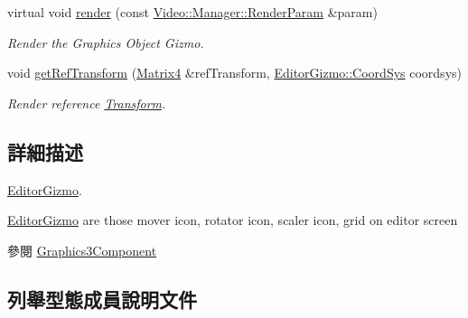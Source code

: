 \begin{DoxyCompactItemize}
virtual void \hyperlink{class_i_dream_sky_1_1_editor_gizmo_a85dc05a2eb5c2b8e1f8e623d9f82a891}{render} (const \hyperlink{class_i_dream_sky_1_1_video_1_1_manager_1_1_render_param}{Video\+::\+Manager\+::\+Render\+Param} \&param)
\begin{DoxyCompactList}\small\item\em Render the Graphics Object Gizmo. \end{DoxyCompactList}\item 
void \hyperlink{class_i_dream_sky_1_1_editor_gizmo_a79d96c8cb5b98f708c5a1c39f7f5b7e4}{get\+Ref\+Transform} (\hyperlink{class_i_dream_sky_1_1_matrix4}{Matrix4} \&ref\+Transform, \hyperlink{class_i_dream_sky_1_1_editor_gizmo_a907a83f34db5629458b5c1da4d13f35f}{Editor\+Gizmo\+::\+Coord\+Sys} coordsys)
\begin{DoxyCompactList}\small\item\em Render reference \hyperlink{class_i_dream_sky_1_1_transform}{Transform}. \end{DoxyCompactList}\end{DoxyCompactItemize}


\subsection{詳細描述}
\hyperlink{class_i_dream_sky_1_1_editor_gizmo}{Editor\+Gizmo}. 

\hyperlink{class_i_dream_sky_1_1_editor_gizmo}{Editor\+Gizmo} are those mover icon, rotator icon, scaler icon, grid on editor screen \begin{DoxySeeAlso}{參閱}
\hyperlink{class_i_dream_sky_1_1_graphics3_component}{Graphics3\+Component} 
\end{DoxySeeAlso}


\subsection{列舉型態成員說明文件}

